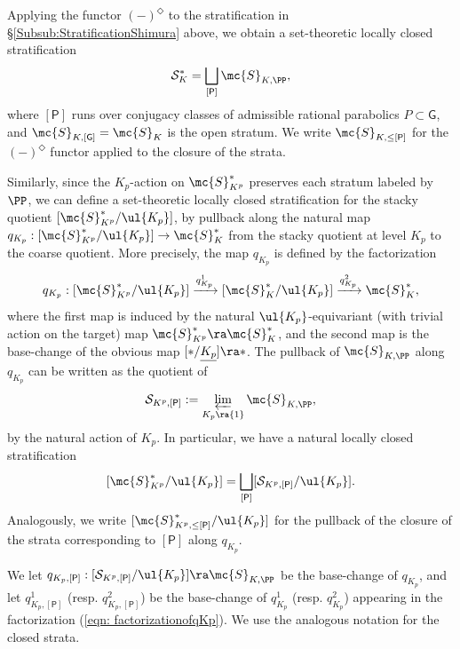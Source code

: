 \documentclass[letterpaper,11pt]{amsart}
\begin{document}
Applying the functor $(-)^\Diamond$ to the stratification in \S \ref{Subsub:StratificationShimura} above, we obtain a set-theoretic locally closed stratification 
\[ \mathcal{S}^{*}_{K} = \bigsqcup_{[\mathsf{P}]} \mc{S}_{K,\PP}, \]
where $[\mathsf{P}]$ runs over conjugacy classes of admissible rational parabolics $P \subset \mathsf{G}$, and $\mc{S}_{K,[\mathsf{G}]} = \mc{S}_K$ is the open stratum. We write $\mc{S}_{K,\leq [\mathsf{P}]}$ for the $(-)^{\Diamond}$ functor applied to the closure of the strata.

Similarly, since the $K_p$-action on $\mc{S}_{K^p}^\ast$ preserves each stratum labeled by $\PP$, we can define a set-theoretic locally closed stratification for the stacky quotient $[\mc{S}_{K^p}^\ast/\ul{K_{p}}]$, by pullback along the natural map $q_{K_p}: [\mc{S}_{K^p}^\ast/\ul{K_{p}}]\to \mc{S}^\ast_{K}$ from the stacky quotient at level $K_{p}$ to the coarse quotient. More precisely, the map $q_{K_{p}}$ is defined by the factorization
\begin{equation}{\label{eqn: factorizationofqKp}}
q_{K_p}: [\mc{S}_{K^p}^{*}/\ul{K_{p}}] \xrightarrow{q^{1}_{K_{p}}} [\mc{S}^\ast_{K}/\ul{K_{p}}] \xrightarrow{q_{K_{p}}^{2}} \mc{S}^\ast_{K},  
\end{equation}
where the first map is induced by the natural $\ul{K_p}$-equivariant (with trivial action on the target) map $\mc{S}_{K^p}^{*} \ra \mc{S}^\ast_{K}$, and the second map is the base-change of the obvious map $[\ast/\underline{K_{p}}] \ra \ast$. The pullback of $\mc{S}_{K,\PP}$ along $q_{K_p}$ can be written as the quotient of 
\[ \mathcal{S}_{K^p,[\mathsf{P}]} := \varprojlim_{K_{p} \ra \{1\}} \mc{S}_{K,\PP}, \]
by the natural action of $K_{p}$. In particular, we have a natural locally closed stratification
\[ [\mc{S}_{K^p}^\ast/\ul{K_{p}}] = \bigsqcup_{[\mathsf{P}]} [\mathcal{S}_{K^p,[\mathsf{P}]}/\ul{K_{p}}]. \]
Analogously, we write $[\mc{S}^{*}_{K^p,\leq [\mathsf{P}]}/\ul{K_{p}}]$ for the pullback of the closure of the strata corresponding to $[\mathsf{P}]$ along $q_{K_{p}}$.

We let $q_{K_{p},[\mathsf{P}]}: [\mathcal{S}_{K^p,[\mathsf{P}]}/\ul{K_{p}}] \ra \mc{S}_{K,\PP}$ be the base-change of $q_{K_{p}}$, and let $q_{K_{p},[\mathsf{P}]}^{1}$ (resp. $q_{K_{p},[\mathsf{P}]}^{2}$) be the base-change of $q_{K_{p}}^{1}$ (resp. $q_{K_{p}}^{2}$) appearing in the factorization (\ref{eqn: factorizationofqKp}). We use the analogous notation for the closed strata.  
\end{document}
